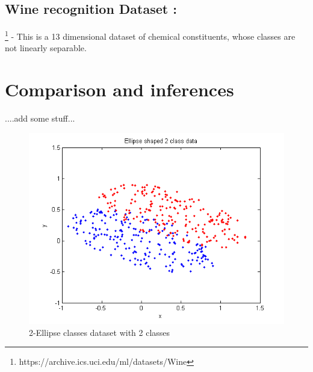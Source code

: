 \documentclass{article} %
\begin{document}
\subsection{Wine recognition Dataset :}\footnote{https://archive.ics.uci.edu/ml/datasets/Wine}  - This is a 13 dimensional dataset of chemical constituents, whose classes are not linearly separable. 


\section{Comparison and inferences}
....add some stuff...

\begin{figure}
  \centering
  \includegraphics[width=\linewidth]{../Code/Ellipse/svdd/data}
  \caption{2-Ellipse classes dataset with 2 classes}
\end{figure}
\end{document}
